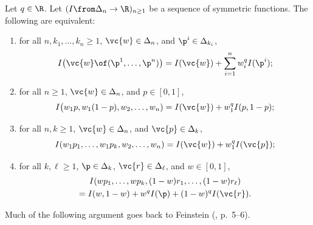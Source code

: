 \begin{lemma}
Let $q \in \R$.  Let $( I \from \Delta_n \to \R)_{n \geq 1}$ be a sequence
of symmetric functions.  The following are equivalent:
% 
\begin{enumerate}
\item 
{}
for all $n, k_1, \ldots, k_n \geq 1$, $\vc{w} \in \Delta_n$, and $\p^i \in
\Delta_{k_i}$, 
\[
I\bigl( \vc{w} \of (\p^1, \ldots, \p^n)\bigr) 
= 
I(\vc{w}) +
\sum_{i = 1}^n w_i^q I(\p^i);
\]

\item
{}
for all $n \geq 1$, $\vc{w} \in \Delta_n$, and $p \in [0, 1]$,
\[
I\bigl(w_1 p, w_1(1 - p), w_2, \ldots, w_n)
=
I(\vc{w}) + w_1^q I(p, 1 - p);
\]

\item
{}
for all $n, k \geq 1$, $\vc{w} \in \Delta_n$, and $\vc{p} \in \Delta_k$,
\[
I(w_1 p_1, \ldots, w_1 p_k, w_2, \ldots, w_n)
=
I(\vc{w}) + w_1^q I(\vc{p});
\]

\item
{}
for all $k, \ell \geq 1$, $\p \in \Delta_k$, $\vc{r} \in \Delta_\ell$, and
$w \in [0, 1]$, 
% 
\begin{multline*}
I(wp_1, \ldots, wp_k, (1 - w)r_1, \ldots, (1 - w)r_\ell)        \\
=
I(w, 1 - w) + w^q I(\p) + (1 - w)^q I(\vc{r}).
\end{multline*}
\end{enumerate}
\end{lemma}
% 
Much of the following argument goes back to Feinstein
(\cite{Fein}, p.~5--6).%
%


